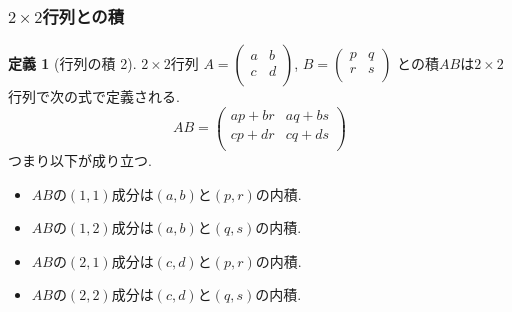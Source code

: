 \documentclass[dvipdfmx,a4paper,11pt]{article}
\theoremstyle{definition}
\newtheorem{dfn}[thm]{定義}
\begin{document}
 \subsubsection{$2\times 2$行列との積}
  \begin{tcolorbox}[
    colback = white,
    colframe = green!35!black,
    fonttitle = \bfseries,
    breakable = true]
    \begin{dfn}[行列の積 2]
    
$2 \times 2$行列
$
A=\begin{pmatrix}
a& b \\
c& d \\
\end{pmatrix}
$,
$
B=
\begin{pmatrix}
p& q \\
r& s\\
\end{pmatrix}
$
との積$AB$は$2 \times 2$行列で次の式で定義される.
$$
AB =
\begin{pmatrix}
ap + br & aq + bs \\
cp + dr& cq + ds\\
\end{pmatrix}
$$
つまり以下が成り立つ.
\begin{itemize}
	\setlength{\parskip}{0cm}
  	\setlength{\itemsep}{0pt} 
\item $AB$の$(1,1)$成分は$(a,b)$と$(p,r)$の内積.
\item $AB$の$(1,2)$成分は$(a,b)$と$(q,s)$の内積.
\item $AB$の$(2,1)$成分は$(c,d)$と$(p,r)$の内積.
\item $AB$の$(2,2)$成分は$(c,d)$と$(q,s)$の内積.
\end{itemize}
  \end{dfn}
 \end{tcolorbox}
 
 
 
\end{document}

